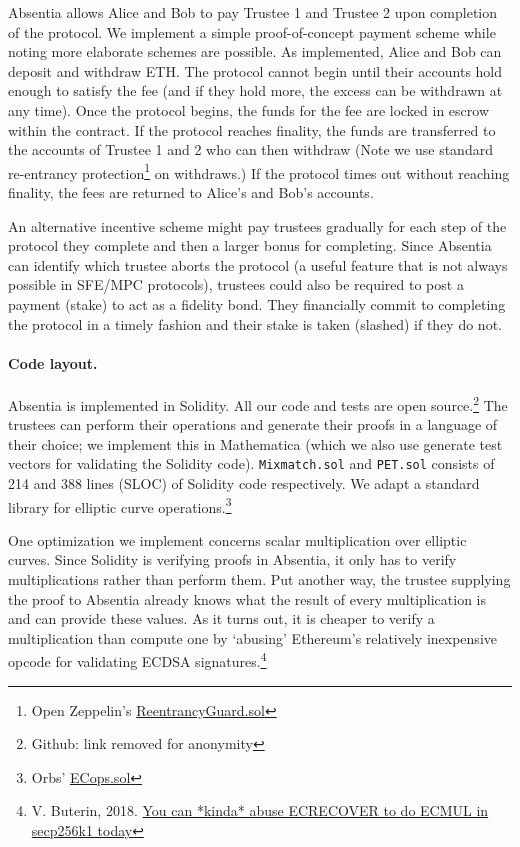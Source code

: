 Absentia allows Alice and Bob to pay Trustee 1 and Trustee 2 upon completion of the protocol. We implement a simple proof-of-concept payment scheme while noting more elaborate schemes are possible. As implemented, Alice and Bob can deposit and withdraw ETH. The protocol cannot begin until their accounts hold enough to satisfy the fee (and if they hold more, the excess can be withdrawn at any time). Once the protocol begins, the funds for the fee are locked in escrow within the contract. If the protocol reaches finality, the funds are transferred to the accounts of Trustee 1 and 2 who can then withdraw (Note we use standard re-entrancy protection\footnote{Open Zeppelin's \href{https://github.com/OpenZeppelin/openzeppelin-contracts/blob/master/contracts/utils/ReentrancyGuard.sol}{ReentrancyGuard.sol}} on withdraws.) If the protocol times out without reaching finality, the fees are returned to Alice's and Bob's accounts. 

An alternative incentive scheme might pay trustees gradually for each step of the protocol they complete and then a larger bonus for completing. Since Absentia can identify which trustee aborts the protocol (a useful feature that is not always possible in SFE/MPC protocols), trustees could also be required to post a payment (stake) to act as a fidelity bond. They financially commit to completing the protocol in a timely fashion and their stake is taken (slashed) if they do not.


\paragraph{Code layout.} 

Absentia is implemented in Solidity. All our code and tests are open source.\footnote{Github: link removed for anonymity} The trustees can perform their operations and generate their proofs in a language of their choice; we implement this in Mathematica (which we also use generate test vectors for validating the Solidity code). \texttt{Mixmatch.sol} and \texttt{PET.sol} consists of 214 and 388 lines (SLOC) of Solidity code respectively. We adapt a standard library for elliptic curve operations.\footnote{Orbs' \href{https://github.com/orbs-network/elliptic-curve-solidity/blob/master/ECops.sol}{ECops.sol}}

One optimization we implement concerns scalar multiplication over elliptic curves. Since Solidity is verifying proofs in Absentia, it only has to verify multiplications rather than perform them. Put another way, the trustee supplying the proof to Absentia already knows what the result of every multiplication is and can provide these values. As it turns out, it is cheaper to verify a multiplication than compute one by `abusing' Ethereum's relatively inexpensive opcode for validating ECDSA signatures.\footnote{V. Buterin, 2018. \href{https://ethresear.ch/t/you-can-kinda-abuse-ecrecover-to-do-ecmul-in-secp256k1-today/2384}{You can *kinda* abuse ECRECOVER to do ECMUL in secp256k1 today}}

